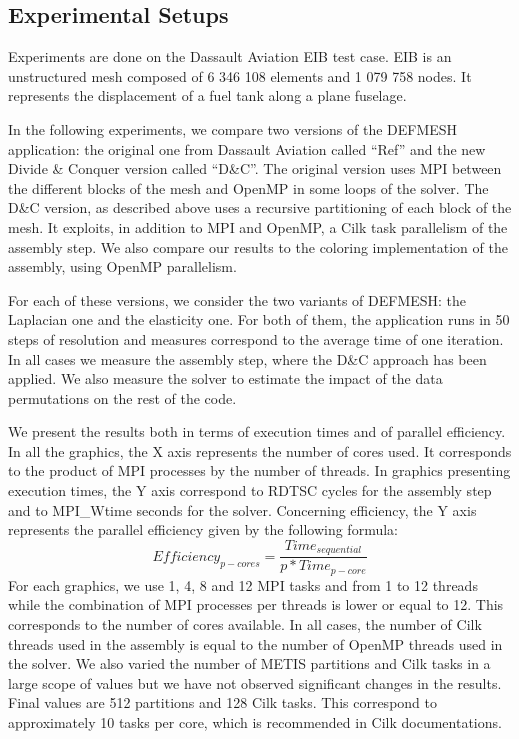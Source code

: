 \documentclass{IOS-Book-Article}
\begin{document}
\subsection{Experimental Setups}
Experiments are done on the Dassault Aviation EIB test case. EIB is an unstructured mesh composed of 6 346 108 elements and 1 079 758 nodes.
It represents the displacement of a fuel tank along a plane fuselage.

In the following experiments, we compare two versions of the DEFMESH application: the original one from Dassault Aviation called “Ref” and the new Divide \& Conquer version called “D\&C”.
The original version uses MPI between the different blocks of the mesh and OpenMP in some loops of the solver.
The D\&C version, as described above uses a recursive partitioning of each block of the mesh. It exploits, in addition to MPI and OpenMP, a Cilk task parallelism of the assembly step.
We also compare our results to the coloring implementation of the assembly, using OpenMP parallelism.

For each of these versions, we consider the two variants of DEFMESH: the Laplacian one and the elasticity one.
For both of them, the application runs in 50 steps of resolution and measures correspond to the average time of one iteration.
In all cases we measure the assembly step, where the D\&C approach has been applied.
We also measure the solver to estimate the impact of the data permutations on the rest of the code.

We present the results both in terms of execution times and of parallel efficiency.
In all the graphics, the X axis represents the number of cores used. It corresponds to the product of MPI processes by the number of threads.
In graphics presenting execution times, the Y axis correspond to RDTSC cycles for the assembly step and to MPI\_Wtime seconds for the solver.
Concerning efficiency, the Y axis represents the parallel efficiency given by the following formula:
$$Efficiency_{p-cores} = \frac{Time_{sequential}}{p*Time_{p-core}}$$
For each graphics, we use 1, 4, 8 and 12 MPI tasks and from 1 to 12 threads while the combination of MPI processes per threads is lower or equal to 12.
This corresponds to the number of cores available. In all cases, the number of Cilk threads used in the assembly is equal to the number of OpenMP threads used in the solver.
We also varied the number of METIS partitions and Cilk tasks in a large scope of values but we have not observed significant changes in the results.
Final values are 512 partitions and 128 Cilk tasks. This correspond to approximately 10 tasks per core, which is recommended in Cilk documentations.
\end{document}
